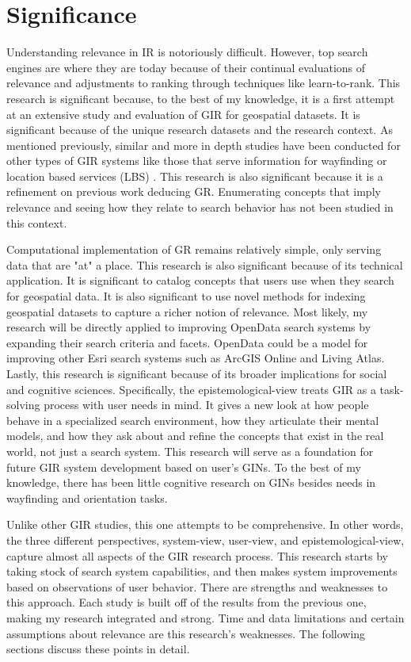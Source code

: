 \chapter{Significance} \label{ch:[chapter 6 label]}

Understanding relevance in IR is notoriously difficult. However, top search engines are where they are today because of their continual evaluations of relevance and adjustments to ranking through techniques like learn-to-rank. This research is significant because, to the best of my knowledge, it is a first attempt at an extensive study and evaluation of GIR for geospatial datasets. It is significant because of the unique research datasets and the research context. As mentioned previously, similar and more in depth studies have been conducted for other types of GIR systems like those that serve information for wayfinding or location based services (LBS) \cite{DeSabbata2012}. This research is also significant because it is a refinement on previous work deducing GR. Enumerating concepts that imply relevance and seeing how they relate to search behavior has not been studied in this context.

Computational implementation of GR remains relatively simple, only serving data that are "at" a place. This research is also significant because of its technical application. It is significant to catalog concepts that users use when they search for geospatial data. It is also significant to use novel methods for indexing geospatial datasets to capture a richer notion of relevance. Most likely, my research will be directly applied to improving OpenData search systems by expanding their search criteria and facets. OpenData could be a model for improving other Esri search systems such as ArcGIS Online and Living Atlas. Lastly, this research is significant because of its broader implications for social and cognitive sciences. Specifically, the epistemological-view treats GIR as a task-solving process with user needs in mind. It gives a new look at how people behave in a specialized search environment, how they articulate their mental models, and how they ask about and refine the concepts that exist in the real world, not just a search system. This research will serve as a foundation for future GIR system development based on user’s GINs. To the best of my knowledge, there has been little cognitive research on GINs besides needs in wayfinding and orientation tasks.

Unlike other GIR studies, this one attempts to be comprehensive. In other words, the three different perspectives, system-view, user-view, and epistemological-view, capture almost all aspects of the GIR research process. This research starts by taking stock of search system capabilities, and then makes system improvements based on observations of user behavior. There are strengths and weaknesses to this approach. Each study is built off of the results from the previous one, making my research integrated and strong. Time and data limitations and certain assumptions about relevance are this research’s weaknesses. The following sections discuss these points in detail.

